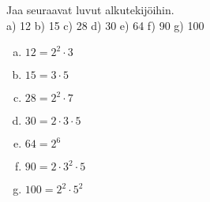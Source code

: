     
    \begin{tehtava}
    Jaa seuraavat luvut alkutekijöihin.\\
    a) 12 \quad b) 15 \quad c) 28 \quad d) 30 \quad e) 64 \quad f) 90 \quad g) 100
    
    \begin{vastaus}
    \begin{enumerate}[a)]
    	\item $12 = 2^2 \cdot 3$
    	\item $15 = 3 \cdot 5$
    	\item $28 = 2^2 \cdot 7$
    	\item $30 = 2 \cdot 3 \cdot 5$
    	\item $64 = 2^6$
    	\item $90 = 2 \cdot 3^2 \cdot 5$
    	\item $100 = 2^2 \cdot 5^2$
    \end{enumerate}
    \end{vastaus}
    \end{tehtava}
